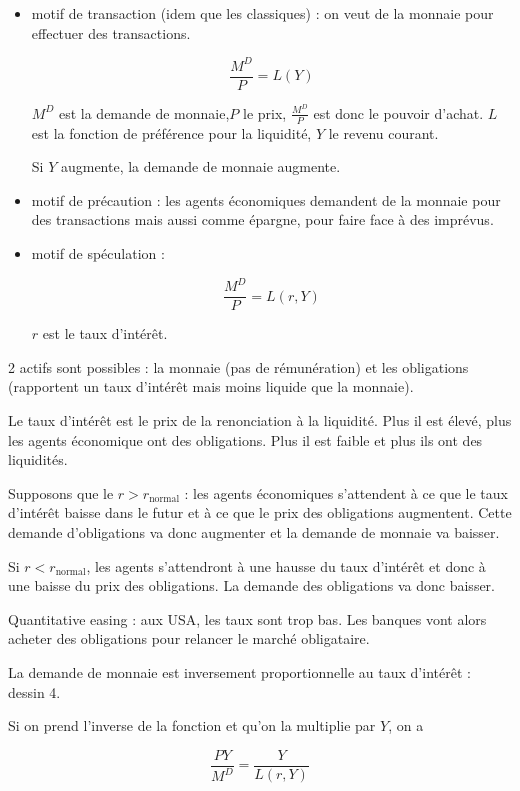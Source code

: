 	\begin{itemize}
		\item motif de transaction (idem que les classiques) : on veut de la monnaie pour effectuer des transactions.
		
		$$\frac{M^D}{P} = L(Y)$$
		
		$M^D$ est la demande de monnaie,$P$ le prix, $\frac{M^D}{P}$ est donc le pouvoir d'achat. $L$ est la fonction de préférence pour la liquidité, $Y$ le revenu courant.
		
		Si $Y$ augmente, la demande de monnaie augmente.
		
		\item motif de précaution : les agents économiques demandent de la monnaie pour des transactions mais aussi comme épargne, pour faire face à des imprévus.
		
		\item motif de spéculation : 
		
		$$\frac{M^D}{P} = L(r, Y)$$
		
		$r$ est le taux d'intérêt.
	\end{itemize}
	
	2 actifs sont possibles : la monnaie (pas de rémunération) et les obligations (rapportent un taux d'intérêt mais moins liquide que la monnaie).
	
	Le taux d'intérêt est le prix de la renonciation à la liquidité. Plus il est élevé, plus les agents économique ont des obligations. Plus il est faible et plus ils ont des liquidités.
	
	Supposons que le $r > r_{\text{normal}}$ : les agents économiques s'attendent à ce que le taux d'intérêt baisse dans le futur et à ce que le prix des obligations augmentent. Cette demande d'obligations va donc augmenter et la demande de monnaie va baisser.
	
	Si $r < r_{\text{normal}}$, les agents s'attendront à une hausse du taux d'intérêt et donc à une baisse du prix des obligations. La demande des obligations va donc baisser.
	
	Quantitative easing : aux USA, les taux sont trop bas. Les banques vont alors acheter des obligations pour relancer le marché obligataire. 
	
	La demande de monnaie est inversement proportionnelle au taux d'intérêt : dessin 4.
	
	Si on prend l'inverse de la fonction et qu'on la multiplie par $Y$, on a
	
	$$\frac{PY}{M^D} = \frac{Y}{L(r, Y)}$$
	
